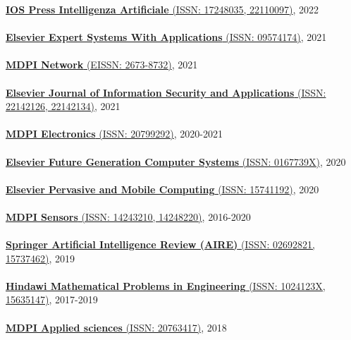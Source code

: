 \href{https://www.iospress.com/catalog/journals/intelligenza-artificiale}{\textbf{IOS Press Intelligenza Artificiale} (ISSN: 17248035, 22110097)}, 2022
\\ \halfblankline \\
\href{https://www.journals.elsevier.com/expert-systems-with-applications}{\textbf{Elsevier Expert Systems With Applications} (ISSN: 09574174)}, 2021
\\ \halfblankline \\
\href{https://www.mdpi.com/journal/network}{\textbf{MDPI Network} (EISSN: 2673-8732)}, 2021
\\ \halfblankline \\
\href{https://www.journals.elsevier.com/journal-of-information-security-and-applications}{\textbf{Elsevier Journal of Information Security and Applications} (ISSN: 22142126, 22142134)}, 2021
\\ \halfblankline \\
\href{https://www.mdpi.com/journal/electronics}{\textbf{MDPI Electronics} (ISSN: 20799292)}, 2020-2021
\\ \halfblankline \\
\href{https://www.sciencedirect.com/journal/future-generation-computer-systems}{\textbf{Elsevier Future Generation Computer Systems} (ISSN: 0167739X)}, 2020
\\ \halfblankline \\
\href{https://www.journals.elsevier.com/pervasive-and-mobile-computing}{\textbf{Elsevier Pervasive and Mobile Computing} (ISSN: 15741192)}, 2020
\\ \halfblankline \\
\href{http://www.mdpi.com/journal/sensors}{\textbf{MDPI Sensors} (ISSN: 14243210, 14248220)}, 2016-2020
\\ \halfblankline \\
\href{https://link.springer.com/journal/10462}{\textbf{Springer Artificial Intelligence Review (AIRE)} (ISSN: 02692821, 15737462)}, 2019
\\ \halfblankline \\
\href{https://www.hindawi.com/journals/mpe/}{\textbf{Hindawi Mathematical Problems in Engineering} (ISSN: 1024123X, 15635147)}, 2017-2019
\\ \halfblankline \\
\href{http://www.mdpi.com/journal/applsci}{\textbf{MDPI Applied sciences} (ISSN: 20763417)}, 2018
\\ \halfblankline \\
